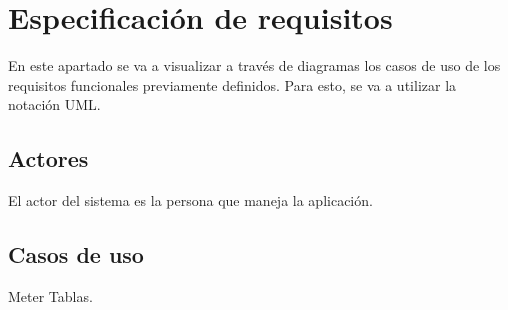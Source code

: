 \section{Especificación de requisitos}

En este apartado se va a visualizar a través de diagramas los casos de uso de los requisitos funcionales previamente deﬁnidos. Para esto, se va a utilizar la notación UML.

\subsection{Actores}

El actor del sistema es la persona que maneja la aplicación.

\subsection{Casos de uso}

Meter Tablas.



